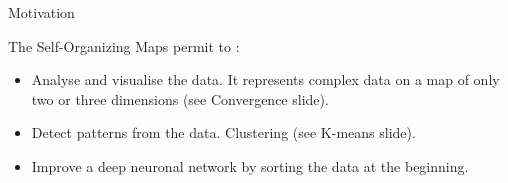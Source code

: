\documentclass{beamer}
\begin{document}
	
	\begin{frame}{Motivation}

		The Self-Organizing Maps permit to : 

		\begin{itemize}
		
			\item Analyse and visualise the data. It represents complex data on a map of only two or three dimensions (see Convergence slide).

			\item Detect patterns from the data. Clustering (see K-means slide).

			\item Improve a deep neuronal network by sorting the data at the beginning.

		\end{itemize}


	\end{frame}
	
\end{document}
